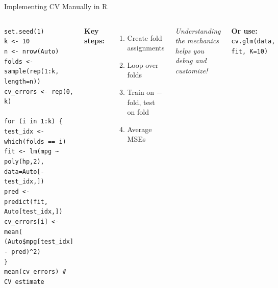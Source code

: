 \documentclass[aspectratio=169, 11pt]{beamer}
\begin{document}
\begin{frame}{Implementing CV Manually in R}
\begin{columns}
\footnotesize
\texttt{set.seed(1)}\\
\texttt{k <- 10}\\
\texttt{n <- nrow(Auto)}\\
\texttt{folds <- sample(rep(1:k, length=n))}\\
\texttt{cv\_errors <- rep(0, k)}\\
\texttt{}\\
\texttt{for (i in 1:k) \{}\\
\texttt{\quad test\_idx <- which(folds == i)}\\
\texttt{\quad fit <- lm(mpg \textasciitilde{} poly(hp,2),}\\
\texttt{\quad\quad\quad\quad data=Auto[-test\_idx,])}\\
\texttt{\quad pred <- predict(fit, Auto[test\_idx,])}\\
\texttt{\quad cv\_errors[i] <- mean(}\\
\texttt{\quad\quad (Auto\$mpg[test\_idx] - pred)\^{}2)}\\
\texttt{\}}\\
\texttt{mean(cv\_errors)  \# CV estimate}
\normalsize

\textbf{Key steps:}

\begin{enumerate}
  \item Create fold assignments
  \item Loop over folds
  \item Train on $-$fold, test on fold
  \item Average MSEs
\end{enumerate}

\vspace{0.3em}
\textit{Understanding the mechanics helps you debug and customize!}

\vspace{0.3em}
\textbf{Or use:}\\
\texttt{cv.glm(data, fit, K=10)}
\end{columns}
\end{frame}
\end{document}
